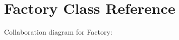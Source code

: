 \hypertarget{classFactory}{}\section{Factory Class Reference}
\label{classFactory}


Collaboration diagram for Factory\+:
